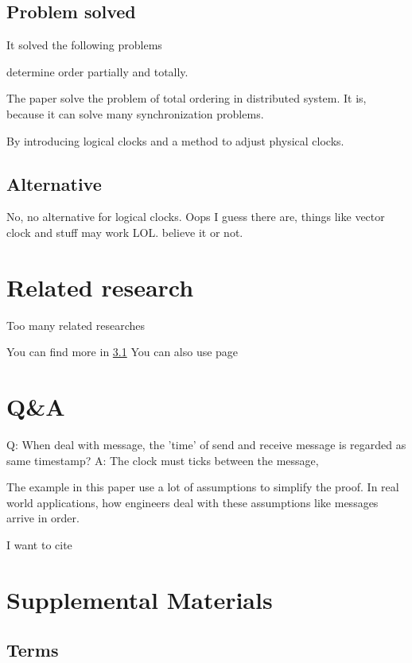 \documentclass[12pt,a4paper,oneside]{article}
\begin{document}
\subsection{Problem solved}

It solved the following problems

determine order partially and totally. %

The paper solve the problem of total ordering in distributed system.
It is, because it can solve many synchronization problems.

By introducing logical clocks and a method to adjust physical clocks.

\subsection{Alternative}

No, no alternative for logical clocks. Oops I guess there are, things
like vector clock and stuff may work LOL. believe it or not.

\section{Related research}


Too many related researches

You can find more in \ref{l1}
You can also use page \pageref{l1}

\section{Q\&A}

Q: When deal with message, the 'time' of send and receive message is regarded as same timestamp?
A: The clock must ticks between the message,  %

The example in this paper use a lot of assumptions to simplify the proof.
In real world applications, how engineers deal with these assumptions like messages
arrive in order.

I want to cite\cite{l}

\section{Supplemental Materials}

\subsection{Terms} \label{l1}
\end{document}
